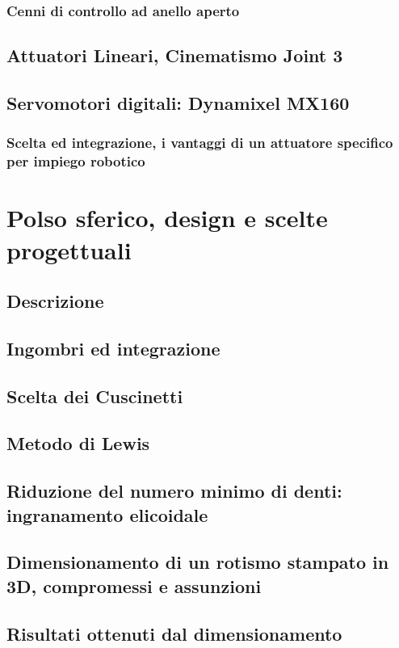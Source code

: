 \documentclass[%
corpo=11pt,
twoside,
 stile=classica,
oldstyle,
greek,%
]{toptesi}
\begin{document}
		
		\subsection{Cenni di controllo ad anello aperto}
	\section{Attuatori Lineari, Cinematismo Joint 3}
		
	\section{Servomotori digitali: Dynamixel MX160}
		\subsection{Scelta ed integrazione, i vantaggi di un attuatore specifico per impiego robotico}
		
\chapter{Polso sferico, design e scelte progettuali}
	\section{Descrizione}
	\section{Ingombri ed integrazione}
	\section{Scelta dei Cuscinetti}
	\section{Metodo di Lewis}
	\section{Riduzione del numero minimo di denti: ingranamento elicoidale}
	\section{Dimensionamento di un rotismo stampato in 3D, compromessi e assunzioni}
	\section{Risultati ottenuti dal dimensionamento}
\end{document}
